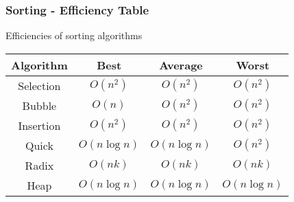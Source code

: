 %

\begin{frame}\frametitle{Sorting - Efficiency Table}
Efficiencies of sorting algorithms
\begin{center}
\begin{tabular}{|c|c|c|c|}
\hline Algorithm & Best & Average & Worst\\\hline
Selection & $O(n^2)$ & $O(n^2)$ & $O(n^2)$\\\hline
Bubble & $O(n)$ & $O(n^2)$ & $O(n^2)$\\\hline
Insertion & $O(n^2)$ & $O(n^2)$ & $O(n^2)$\\\hline
Quick & $O(n\log n)$ & $O(n\log n)$ & $O(n^2)$\\\hline
Radix & $O(nk)$ & $O(nk)$ & $O(nk)$\\\hline
Heap & $O(n\log n)$ & $O(n\log n)$ & $O(n\log n)$\\\hline
\end{tabular}
\end{center}
\end{frame}
